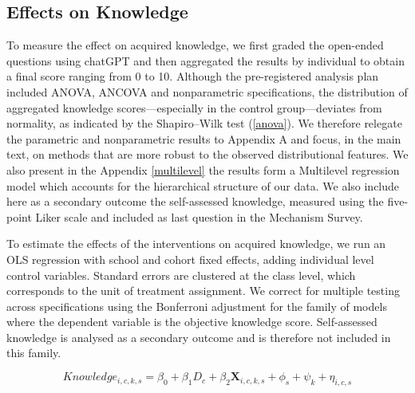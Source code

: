 \documentclass[preprint,12pt]{elsarticle}
\begin{document}
\subsection{Effects on Knowledge}

To measure the effect on acquired knowledge, we first graded the open-ended questions using chatGPT and then aggregated the results by individual to obtain a final score ranging from 0 to 10.
Although the pre-registered analysis plan included ANOVA, ANCOVA and nonparametric specifications, the distribution of aggregated knowledge scores—especially in the control group—deviates from normality, as indicated by the Shapiro–Wilk test (\ref{anova}). We therefore relegate the parametric and nonparametric results to Appendix A and focus, in the main text, on methods that are more robust to the observed distributional features. We also present in the Appendix \ref{multilevel} the results form a Multilevel regression model which accounts for the hierarchical structure of our data.
We also include here as a secondary outcome the self-assessed knowledge, measured using the five-point Liker scale and included as last question in the Mechanism Survey.


To estimate the effects of the interventions on acquired knowledge, we run an OLS regression with school and cohort fixed effects, adding individual level control variables. Standard errors are clustered at the class level, which corresponds to the unit of treatment assignment. We correct for multiple testing across specifications using the Bonferroni adjustment for the family of models where the dependent variable is the objective knowledge score. Self-assessed knowledge is analysed as a secondary outcome and is therefore not included in this family.

\[
Knowledge_{i,c,k,s} = \beta_0 + \beta_1 D_c + \beta_2\textbf{X}_{i,c,k,s} + \phi_s + \psi_k + \eta_{i,c,s}
\]

\end{document}
